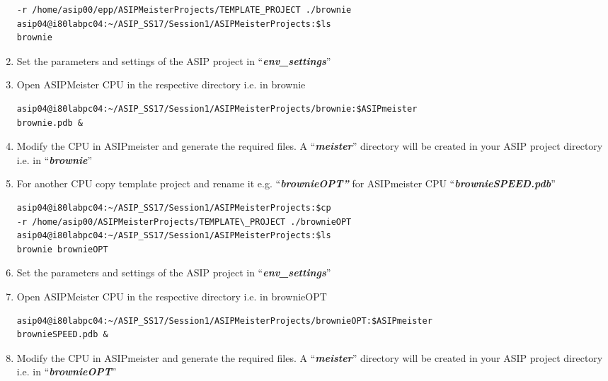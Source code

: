 \begin{enumerate}
\begin{lstlisting}
-r /home/asip00/epp/ASIPMeisterProjects/TEMPLATE_PROJECT ./brownie
asip04@i80labpc04:~/ASIP_SS17/Session1/ASIPMeisterProjects:$ls
brownie
\end{lstlisting}
\item Set the parameters and settings of the ASIP project in
	``\emph{\textbf{env\_settings}}''
\item Open ASIPMeister CPU in the respective directory i.e. in brownie
\begin{lstlisting}
asip04@i80labpc04:~/ASIP_SS17/Session1/ASIPMeisterProjects/brownie:$ASIPmeister
brownie.pdb &
\end{lstlisting}
\item Modify the CPU in ASIPmeister and generate the required files. A
	``\emph{\textbf{meister}}'' directory will be created in your ASIP
	project directory i.e. in ``\emph{\textbf{brownie}}''
\item For another CPU copy template project and rename it e.g.
	``\emph{\textbf{brownieOPT''}} for ASIPmeister CPU
	``\emph{\textbf{brownieSPEED.pdb}}''
\begin{lstlisting}
asip04@i80labpc04:~/ASIP_SS17/Session1/ASIPMeisterProjects:$cp
-r /home/asip00/ASIPMeisterProjects/TEMPLATE\_PROJECT ./brownieOPT
asip04@i80labpc04:~/ASIP_SS17/Session1/ASIPMeisterProjects:$ls
brownie brownieOPT
\end{lstlisting}
\item Set the parameters and settings of the ASIP project in
	``\emph{\textbf{env\_settings}}''
\item Open ASIPMeister CPU in the respective directory i.e. in brownieOPT
\begin{lstlisting}
asip04@i80labpc04:~/ASIP_SS17/Session1/ASIPMeisterProjects/brownieOPT:$ASIPmeister
brownieSPEED.pdb &
\end{lstlisting}
\item Modify the CPU in ASIPmeister and generate the required files. A
	``\emph{\textbf{meister}}'' directory will be created in your ASIP
	project directory i.e. in ``\emph{\textbf{brownieOPT}}''
\end{enumerate}